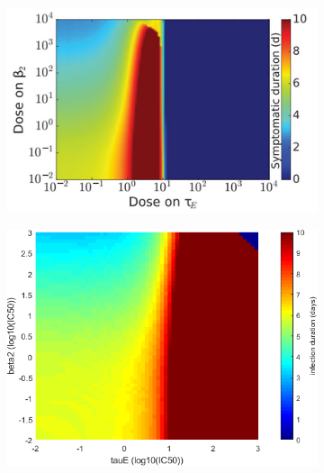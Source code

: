 \documentclass[a4paper,11pt]{article}
\begin{document}
\begin{figure}[H]
\begin{subfigure}{0.4\textwidth}
    \includegraphics[width=\textwidth]{MBeta2TauET.png}
    \end{subfigure}
    \begin{subfigure}{0.35\textwidth}

    \includegraphics[width=\textwidth]{Beta2TauE_times.png}
    \end{subfigure}

     \begin{subfigure}{0.4\textwidth}


\end{subfigure}
\end{figure}
\end{document}
